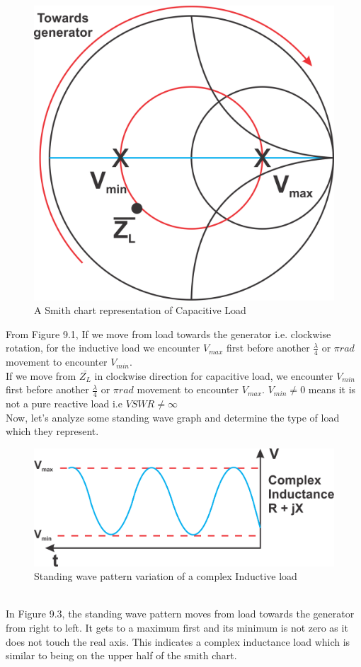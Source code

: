 \begin{figure}[h!]
\centering
\includegraphics[scale=0.4]{./graphics/Group92}
\caption{A Smith chart representation of Capacitive Load}
\end{figure}From Figure 9.1, If we move from load towards the generator i.e. clockwise rotation, for the inductive load we encounter $V_{max}$ first before another $\frac{\lambda}{4}$ or $\pi rad$ movement to encounter ${V_{min}}$.\\
If we move from $\bar{Z_L}$ in clockwise direction for capacitive load, we encounter $V_{min}$ first before another $\frac{\lambda}{4}$ or $\pi rad$ movement to encounter $V_{max}$. $V_{min}\neq0$ means it is not a pure reactive load i.e $VSWR\neq\infty$\\
Now, let's analyze some standing wave graph and determine the type of load which they represent.
\begin{figure}[h!]
\centering
\includegraphics[scale=0.5]{./graphics/Group93}
\caption{Standing wave pattern variation of a complex Inductive load}
\end{figure}\\In Figure 9.3, the standing wave pattern moves from load towards the generator from right to left. It gets to a maximum first and its minimum is not zero as it does not touch the real axis. This indicates a complex inductance load which is similar to being on the upper half of the smith chart.\\
